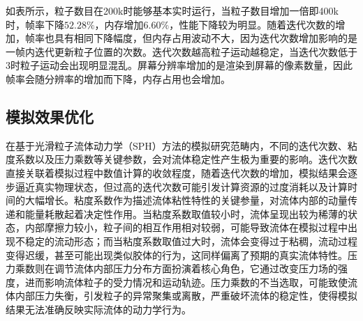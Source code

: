 如表所示，粒子数目在200k时能够基本实时运行，当粒子数目增加一倍即400k时，帧率下降$52.28\%$，内存增加$6.60\%$，性能下降较为明显。随着迭代次数的增加，帧率也具有相同下降幅度，但内存占用波动不大，因为迭代次数增加影响的是一帧内迭代更新粒子位置的次数。迭代次数越高粒子运动越稳定，当迭代次数低于3时粒子运动会出现明显混乱。屏幕分辨率增加的是渲染到屏幕的像素数量，因此帧率会随分辨率的增加而下降，内存占用也会增加。

\subsection{模拟效果优化}

在基于光滑粒子流体动力学（SPH）方法的模拟研究范畴内，不同的迭代次数、粘度系数以及压力乘数等关键参数，会对流体稳定性产生极为重要的影响。迭代次数直接关联着模拟过程中数值计算的收敛程度，随着迭代次数的增加，模拟结果会逐步逼近真实物理状态，但过高的迭代次数可能引发计算资源的过度消耗以及计算时间的大幅增长。粘度系数作为描述流体粘性特性的关键参量，对流体内部的动量传递和能量耗散起着决定性作用。当粘度系数取值较小时，流体呈现出较为稀薄的状态，内部摩擦力较小，粒子间的相互作用相对较弱，可能导致流体在模拟过程中出现不稳定的流动形态；而当粘度系数取值过大时，流体会变得过于粘稠，流动过程变得迟缓，甚至可能出现类似胶体的行为，这同样偏离了预期的真实流体特性。压力乘数则在调节流体内部压力分布方面扮演着核心角色，它通过改变压力场的强度，进而影响流体粒子的受力情况和运动轨迹。压力乘数的不当选取，可能致使流体内部压力失衡，引发粒子的异常聚集或离散，严重破坏流体的稳定性，使得模拟结果无法准确反映实际流体的动力学行为。


